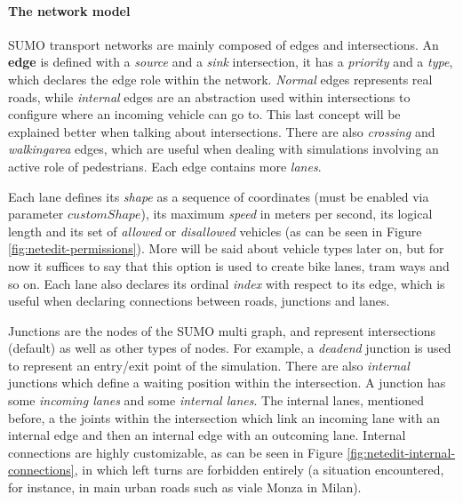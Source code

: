 \paragraph{The network model}

SUMO transport networks are mainly composed of edges and intersections. An \textbf{edge} is defined with a \textit{source} and a \textit{sink} intersection, it has a \textit{priority} and a \textit{type}, which declares the edge role within the network. \textit{Normal} edges represents real roads, while \textit{internal} edges are an abstraction used within intersections to configure where an incoming vehicle can go to. This last concept will be explained better when talking about intersections. There are also \textit{crossing} and \textit{walkingarea} edges, which are useful when dealing with simulations involving an active role of pedestrians. Each edge contains more \textit{lanes}.

Each lane defines its \textit{shape} as a sequence of coordinates (must be enabled via parameter $customShape$), its maximum \textit{speed} in meters per second, its logical length and its set of \textit{allowed} or \textit{disallowed} vehicles (as can be seen in Figure \ref{fig:netedit-permissions}). More will be said about vehicle types later on, but for now it suffices to say that this option is used to create bike lanes, tram ways and so on. Each lane also declares its ordinal \textit{index} with respect to its edge, which is useful when declaring connections between roads, junctions and lanes.


Junctions are the nodes of the SUMO multi graph, and represent intersections (default) as well as other types of nodes. For example, a \textit{deadend} junction is used to represent an entry/exit point of the simulation. There are also \textit{internal} junctions which define a waiting position within the intersection. A junction has some \textit{incoming lanes} and some \textit{internal lanes}. The internal lanes, mentioned before, a the joints within the intersection which link an incoming lane with an internal edge and then an internal edge with an outcoming lane. Internal connections are highly customizable, as can be seen in Figure \ref{fig:netedit-internal-connections}, in which left turns are forbidden entirely (a situation encountered, for instance, in main urban roads such as viale Monza in Milan).

